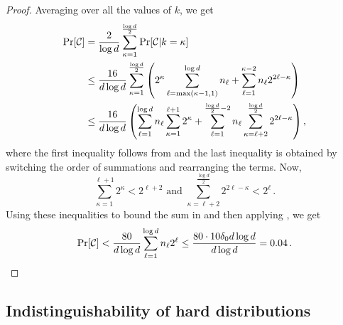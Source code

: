 \documentclass{toc}
\newcommand{\cC}{\ensuremath{\mathcal{C}}}
\newcommand{\lbconst}{\ensuremath{\delta_0}}
\begin{document}
\begin{proof}
Averaging over all
the  %
values of $k$, we get
\begin{align}
\Pr[\cC] & = \frac{2}{\log d} \sum_{\kappa=1}^{\frac{\log d}{2}}\Pr[\cC | k = \kappa] \notag \\
& \leq \frac{16}{d \log d} \sum_{\kappa=1}^{\frac{\log d}{2}} \left(  2^{\kappa} \sum\limits_{\ell = \max(\kappa - 1,1)}^{\log d} n_\ell + \sum_{\ell=1}^{\kappa-2} n_\ell 2^{2\ell - \kappa} \right) \notag \\
%
%
%
& \leq \frac{16}{d\log d} \left(\sum_{\ell=1}^{\log d} n_\ell \sum\limits_{\kappa = 1}^{\ell+1} 2^{\kappa} + \sum_{\ell=1}^{\frac{\log d}{2} - 2} n_\ell \sum\limits_{\kappa = \ell + 2}^{\frac{\log d}{2}} 2^{2\ell - \kappa}  \right), \label{eq:pr-c}
\end{align}
where the first inequality follows from  and the last inequality is obtained by switching the order of summations and rearranging the terms.
Now,
\[
\sum_{\kappa = 1}^{\ell+1} 2^{\kappa} < 2^{\ell + 2}
\text{ and }
\sum_{\kappa= \ell+2}^{\frac{\log d}{2}} 2^{2\ell - \kappa} < 2^\ell\,.
\]
Using these inequalities to bound the sum in  and then applying , we get
\[
\Pr[\cC] < \frac{80}{d\log d} \sum_{\ell=1}^{\log d} n_\ell 2^\ell
\leq \frac{80 \cdot 10 \lbconst d \log d}{d\log d}=0.04\,.\qedhere  %
\]
\end{proof}

\subsection{Indistinguishability of hard distributions}\label{sec:indisting}
\end{document}
